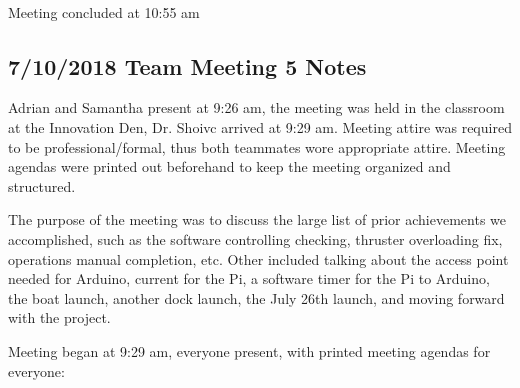\documentclass[12pt]{article}
\begin{document}
			\noindent
			\\Meeting concluded at 10:55 am
			
			\clearpage
				
			
		\subsection{7/10/2018 Team Meeting 5 Notes}
			
			\noindent
			Adrian and Samantha present at 9:26 am, the meeting was held in the classroom at the Innovation Den, Dr. Shoivc arrived at 9:29 am. Meeting attire was required to be professional/formal, thus both teammates wore appropriate attire. Meeting agendas were printed out beforehand to keep the meeting organized and structured.
			
			\noindent
			The purpose of the meeting was to discuss the large list of prior achievements we accomplished, such as the software controlling checking, thruster overloading fix, operations manual completion, etc. Other included talking about the access point needed for Arduino, current for the Pi, a software timer for the Pi to Arduino, the boat launch, another dock launch, the July 26th launch, and moving forward with the project.
			
			\noindent
			Meeting began at 9:29 am, everyone present, with printed meeting agendas for everyone:
			
\end{document}
